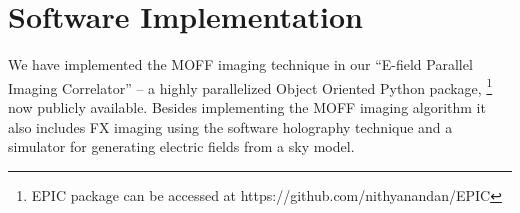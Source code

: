 \documentclass[a4paper,fleqn,usenatbib]{../mnras}
\begin{document}
%

\section{Software Implementation}\label{sec:software}

We have implemented the MOFF imaging technique in our ``E-field Parallel Imaging
Correlator'' -- a highly parallelized Object Oriented Python package,
\footnote{EPIC package can be accessed at https://github.com/nithyanandan/EPIC}
now publicly available. Besides implementing the MOFF imaging algorithm it also
includes FX imaging using the software holography technique and a simulator for
generating electric fields from a sky model. 
\end{document}
